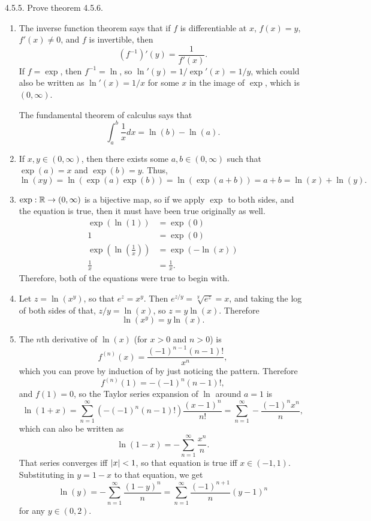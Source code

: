 \documentclass{article}
\begin{document}
\bigskip
\begin{prob}
    4.5.5. Prove theorem 4.5.6.
\end{prob}
\begin{enumerate}[label=(\alph*)]
    \item The inverse function theorem says that if $f$ is differentiable at $x$, $f(x)=y$, $f'(x)\neq0$, and $f$ is invertible, then
        \[ (f^{-1})'(y) = \frac{1}{f'(x)}. \]
        If $f=\exp$, then $f^{-1}=\ln$, so $\ln'(y)=1/\exp'(x)=1/y$, which could also be written as $\ln'(x)=1/x$ for some $x$ in the image of $\exp$, which is $(0, \infty)$.
        \par
        The fundamental theorem of calculus says that
        \[ \int_a^b \frac{1}{x} dx = \ln(b)-\ln(a). \]
    \item If $x, y \in (0, \infty)$, then there exists some $a,b \in (0, \infty)$ such that $\exp(a)=x$ and $\exp(b)=y$. Thus,
        \[ \ln(xy) = \ln \left( \exp(a)\exp(b) \right) =\ln \left( \exp(a+b) \right) = a + b = \ln(x)+\ln(y). \]
    \item $\exp: \mathbb{R} \rightarrow (0, \infty)$ is a bijective map, so if we apply $\exp$ to both sides, and the equation is true, then it must have been true originally as well.
        \begin{align*}
            \exp(\ln(1))&=\exp(0) \\
            1 &= \exp(0) \\
            \exp \left( \ln \left( \frac{1}{x} \right) \right) &= \exp \left( -\ln(x) \right) \\
            \frac{1}{x} &= \frac{1}{x}.
        \end{align*}
        Therefore, both of the equations were true to begin with.
    \item Let $z = \ln(x^y)$, so that $e^z=x^y$. Then $e^{z/y}=\sqrt[y]{e^z}=x$, and taking the log of both sides of that, $z/y=\ln(x)$, so $z=y\ln(x)$. Therefore
        \[ \ln(x^y)=y\ln(x). \]
    \item The $n$th derivative of $\ln(x)$ (for $x > 0$ and $n > 0$) is
        \[ f^{(n)}(x) = \frac{(-1)^{n-1}(n-1)!}{x^n}, \]
        which you can prove by induction of by just noticing the pattern. Therefore
        \[ f^{(n)}(1) = - (-1)^n(n-1)!, \]
        and $f(1)=0$, so the Taylor series expansion of $\ln$ around $a=1$ is
        \[ \ln(1+x) = \sum_{n=1}^\infty \left( - (-1)^n (n-1)! \right) \frac{(x-1)^n}{n!} = \sum_{n=1}^\infty -\frac{(-1)^nx^n}{n}, \]
        which can also be written as
        \[ \ln(1-x) = - \sum_{n=1}^\infty \frac{x^n}{n}. \]
        That series converges iff $\left\lvert x \right\rvert<1$, so that equation is true iff $x \in (-1, 1)$. Substituting in $y=1-x$ to that equation, we get
        \[ \ln(y) = - \sum_{n=1}^\infty \frac{(1-y)^n}{n} = \sum_{n=1}^\infty \frac{(-1)^{n+1}}{n} (y-1)^n \]
        for any $y \in (0,2)$.
\end{enumerate}


\end{document}
